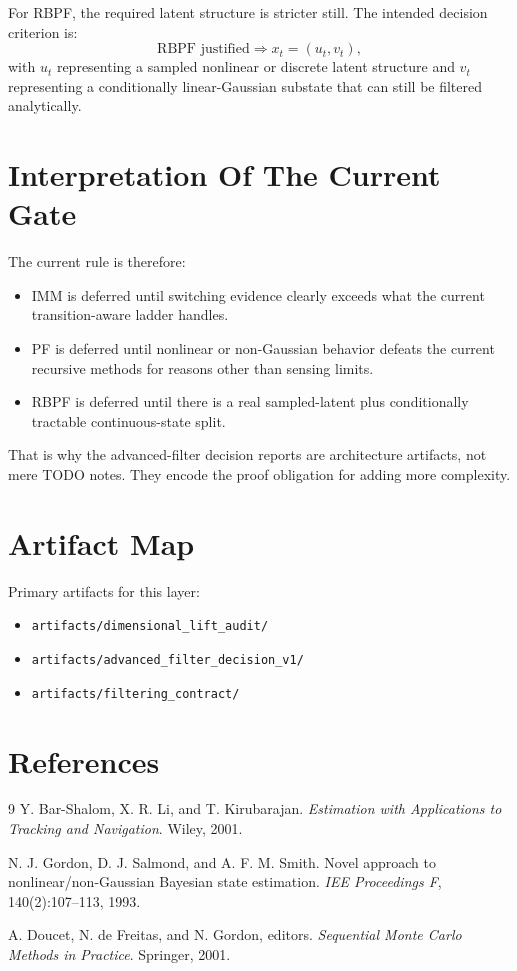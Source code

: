 \documentclass[11pt]{article}
\begin{document}
For RBPF, the required latent structure is stricter still. The intended
decision criterion is:
\begin{equation}
    \text{RBPF justified}
    \Longrightarrow
    x_t = (u_t, v_t),
\end{equation}
with \(u_t\) representing a sampled nonlinear or discrete latent structure and
\(v_t\) representing a conditionally linear-Gaussian substate that can still be
filtered analytically.

\section{Interpretation Of The Current Gate}

The current rule is therefore:
\begin{itemize}[leftmargin=1.5em]
    \item IMM is deferred until switching evidence clearly exceeds what the
    current transition-aware ladder handles.
    \item PF is deferred until nonlinear or non-Gaussian behavior defeats the
    current recursive methods for reasons other than sensing limits.
    \item RBPF is deferred until there is a real sampled-latent plus
    conditionally tractable continuous-state split.
\end{itemize}

That is why the advanced-filter decision reports are architecture artifacts, not
mere TODO notes. They encode the proof obligation for adding more complexity.

\section{Artifact Map}

Primary artifacts for this layer:
\begin{itemize}[leftmargin=1.5em]
    \item \texttt{artifacts/dimensional\_lift\_audit/}
    \item \texttt{artifacts/advanced\_filter\_decision\_v1/}
    \item \texttt{artifacts/filtering\_contract/}
\end{itemize}

\section{References}
\begin{thebibliography}{9}
Y. Bar-Shalom, X. R. Li, and T. Kirubarajan.
\newblock \emph{Estimation with Applications to Tracking and Navigation}.
\newblock Wiley, 2001.

N. J. Gordon, D. J. Salmond, and A. F. M. Smith.
\newblock Novel approach to nonlinear/non-Gaussian Bayesian state estimation.
\newblock \emph{IEE Proceedings F}, 140(2):107--113, 1993.

A. Doucet, N. de Freitas, and N. Gordon, editors.
\newblock \emph{Sequential Monte Carlo Methods in Practice}.
\newblock Springer, 2001.
\end{thebibliography}
\end{document}
